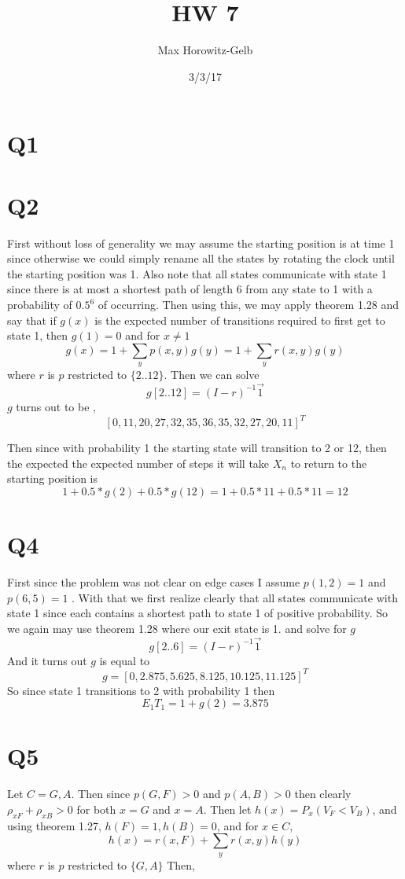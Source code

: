 \documentclass{article}
\title{HW 7}
\author{Max Horowitz-Gelb}
\date{3/3/17}
\begin{document}
\maketitle
\section*{Q1}
\section*{Q2}
First without loss of generality we may assume the starting position is at time 1 since otherwise we could simply rename all the states by rotating the clock until the starting position was 1. Also note that all states communicate with state 1 since there is at most a shortest path of length 6 from any state to 1 with a probability of $0.5^{6}$ of occurring.
Then using this, we may apply theorem 1.28 and say that
if $g(x)$ is the expected number of transitions required to first get to state 1, then
$g(1) = 0$ and for $x \neq 1$
\[
g(x) = 1 + \sum_y p(x,y)g(y) = 1 + \sum_y r(x,y)g(y)
\]
where $r$ is $p$ restricted to $\{2 .. 12\}$.
Then we can solve
\[
g[2 .. 12] = (I - r)^{-1} \vec{1}
\]
$g$ turns out to be ,
\[
[0, 11,  20,  27,  32,  35,  36,  35,  32,  27,  20,  11]^T
\]

Then since with probability 1 the starting state will transition to 2 or 12, then the expected the expected number of steps it will take $X_n$ to return to the starting position is
\[
1 + 0.5 * g(2) + 0.5 * g(12) = 1 + 0.5 * 11 + 0.5 * 11 = 12
\]

\section*{Q4}
First since the problem was not clear on edge cases I assume $p(1,2) = 1$ and $p(6,5) = 1$ . With that we first realize clearly that all states communicate with state 1 since each contains a shortest path to state 1 of positive probability. 
So we again may use theorem 1.28 where our exit state is 1. 
and solve for $g$
\[
g[2 .. 6] = (I - r)^{-1} \vec{1}
\]
And it turns out $g$ is equal to 
\[
g = [0 , 2.875,   5.625,   8.125,  10.125,  11.125]^T
\]
So since state 1 transitions to 2 with probability 1 then
\[
E_1T_1 = 1 + g(2) = 3.875
\]

\section*{Q5}
Let $C = {G,A}$. Then since $p(G,F) > 0$ and $p(A,B) > 0$ then clearly $\rho_{xF} + \rho_{xB} > 0 $ for both $x = G$ and $x= A$.
Then let $h(x) = P_x(V_F < V_B)$, and using theorem 1.27,
$h(F) = 1, h(B) = 0$, and for $x \in C$,
\[
h(x) = r(x,F) + \sum_y r(x,y)h(y)
\]
where $r$ is $p$ restricted to $\{G,A\}$
Then,
\end{document}
